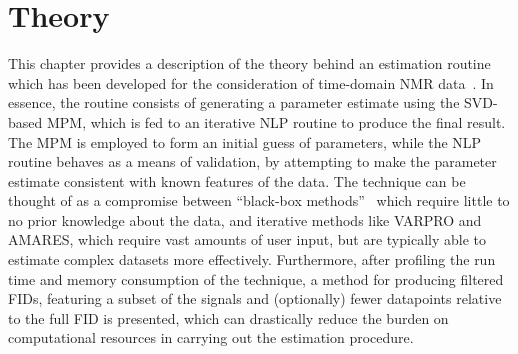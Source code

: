 \chapter{Theory}
\label{chap:theory}

This chapter provides a description of the theory behind an estimation
routine which has been developed for the consideration of time-domain \ac{NMR}
data~\cite{Hua1991,Lin1997,Nocedal2006}\label{corr:prev-work}.
In essence, the routine consists of generating a parameter estimate using the
\ac{SVD}-based \ac{MPM}, which is fed to an iterative \ac{NLP} routine to
produce the final result. The \ac{MPM} is employed to form an initial
guess of parameters, while the \ac{NLP} routine behaves as a means of validation,
by attempting to make the parameter estimate consistent with
known features of the data. The technique can be thought of as a compromise
between ``black-box methods''~\cite{Poullet2008} which require little to no
prior knowledge about the data, and iterative methods like \ac{VARPRO} and
\ac{AMARES}, which require vast amounts of user input, but are typically
able to estimate complex datasets more effectively.
Furthermore, after profiling the run time and memory consumption of the
technique, a method for producing filtered \acp{FID}, featuring a subset of the
signals and (optionally) fewer datapoints relative to the full \ac{FID} is
presented, which can drastically reduce the burden on computational resources
in carrying out the estimation procedure.







